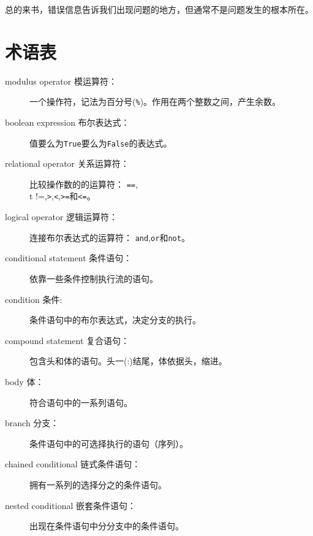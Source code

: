 {{

总的来书，错误信息告诉我们出现问题的地方，但通常不是问题发生的根本所在。

\section{术语表}

\begin{description}

\item [modulus operator 模运算符：] 一个操作符，记法为百分号({\tt \%})。作用在两个整数之间，产生余数。

\item [boolean expression 布尔表达式：]值要么为{\tt True}要么为{\tt False}的表达式。

\item [relational operator 关系运算符：] 比较操作数的的运算符：
{\tt ==},{\\t !=},{\tt >},{\tt <},{\tt >=}和{\tt <=}。

\item [logical operator 逻辑运算符：]连接布尔表达式的运算符：
{\tt and},{\tt or}和{\tt not}。

\item [conditional statement 条件语句：]依靠一些条件控制执行流的语句。

\item [condition 条件:] 条件语句中的布尔表达式，决定分支的执行。

\item [compound statement 复合语句：]包含头和体的语句。头一(:)结尾，体依据头，缩进。

\item [body 体：] 符合语句中的一系列语句。

\item [branch 分支：]条件语句中的可选择执行的语句（序列）。

\item [chained conditional 链式条件语句：] 拥有一系列的选择分之的条件语句。

\item [nested conditional 嵌套条件语句：]出现在条件语句中分分支中的条件语句。


\end{description}}}
